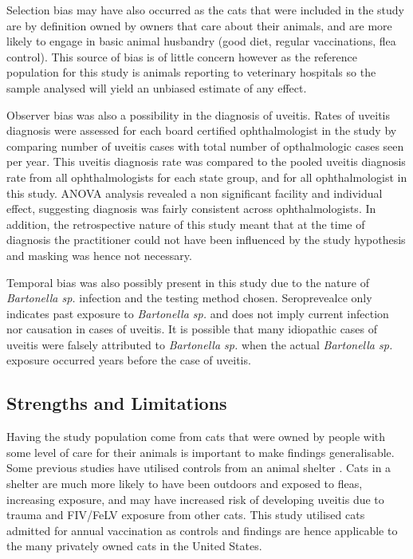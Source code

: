 \documentclass[11pt,twocolumn]{article}
\begin{document}
		Selection bias may have also occurred as the cats that were included in the study are by definition owned by owners that care about their animals, and are more likely to engage in basic animal husbandry (good diet, regular vaccinations, flea control).
		This source of bias is of little concern however as the reference population for this study is animals reporting to veterinary hospitals so the sample analysed will yield an unbiased estimate of any effect.


		Observer bias was also a possibility in the diagnosis of uveitis.
		Rates of uveitis diagnosis were assessed for each board certified ophthalmologist in the study by comparing number of uveitis cases with total number of opthalmologic cases seen per year. This uveitis diagnosis rate was compared to the pooled uveitis diagnosis rate from all ophthalmologists for each state group, and for all ophthalmologist in this study.
		ANOVA analysis revealed a non significant facility and individual effect, suggesting diagnosis was fairly consistent across ophthalmologists.
		In addition, the retrospective nature of this study meant that at the time of diagnosis the practitioner could not have been influenced by the study hypothesis and masking was hence not necessary. 


		Temporal bias was also possibly present in this study due to the nature of \emph{Bartonella sp.} infection and the testing method chosen. 
		Seroprevealce only indicates past exposure to \emph{Bartonella sp.} and does not imply current infection nor causation in cases of uveitis.
		It is possible that many idiopathic cases of uveitis were falsely attributed to \emph{Bartonella sp.} when the actual \emph{Bartonella sp.} exposure occurred years before the case of uveitis.


	\subsection{Strengths and Limitations}
		Having the study population come from  cats that were owned by people with some level of care for their animals is important to make findings generalisable.
		Some previous studies have utilised controls from an animal shelter \cite{Lappin2000,Powell2010}. Cats in a shelter are much more likely to have been outdoors and exposed to fleas, increasing exposure, and may have increased risk of developing uveitis due to trauma and FIV/FeLV exposure from other cats\cite{Hill2000}.
		This study utilised cats admitted for annual vaccination as controls and findings are hence applicable to the many privately owned cats in the United States.
\end{document}

